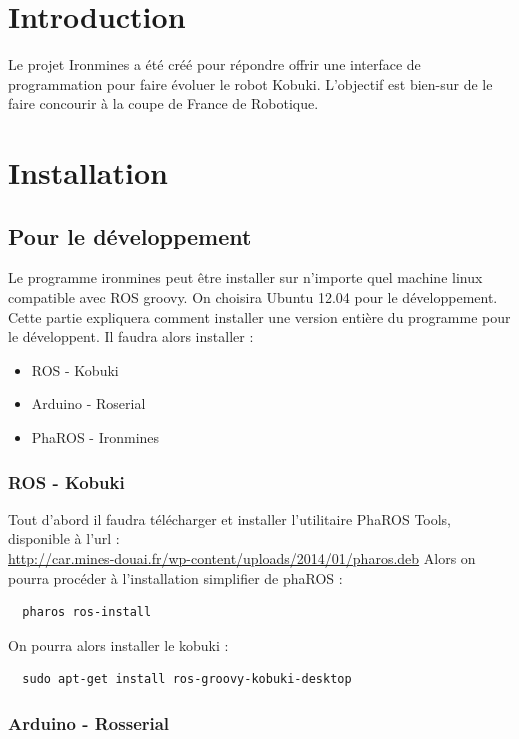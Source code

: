 \documentclass[a4paper, 11pt]{article}
\begin{document}
\section{Introduction}

Le projet Ironmines a été créé pour répondre offrir une interface de
programmation pour faire évoluer le robot Kobuki. L'objectif est
bien-sur de le faire concourir à la coupe de France de Robotique.

\section{Installation}
\subsection{Pour le développement}
Le programme ironmines peut être installer sur n'importe quel machine
linux compatible avec ROS groovy. On choisira Ubuntu 12.04 pour le
développement. Cette partie expliquera comment installer une version
entière du programme pour le développent. Il faudra alors installer :
\begin{itemize}
\item ROS - Kobuki
\item Arduino - Roserial
\item PhaROS - Ironmines
\end{itemize}

\subsubsection{ROS - Kobuki}

Tout d'abord il faudra télécharger et installer l'utilitaire PhaROS
Tools, disponible à l'url :\\
\url{http://car.mines-douai.fr/wp-content/uploads/2014/01/pharos.deb}
Alors on pourra procéder à l'installation simplifier de phaROS :

\begin{verbatim}
  pharos ros-install
\end{verbatim}
On pourra alors installer le kobuki :
\begin{verbatim}
  sudo apt-get install ros-groovy-kobuki-desktop
\end{verbatim}

\subsubsection{Arduino - Rosserial}
\end{document}
